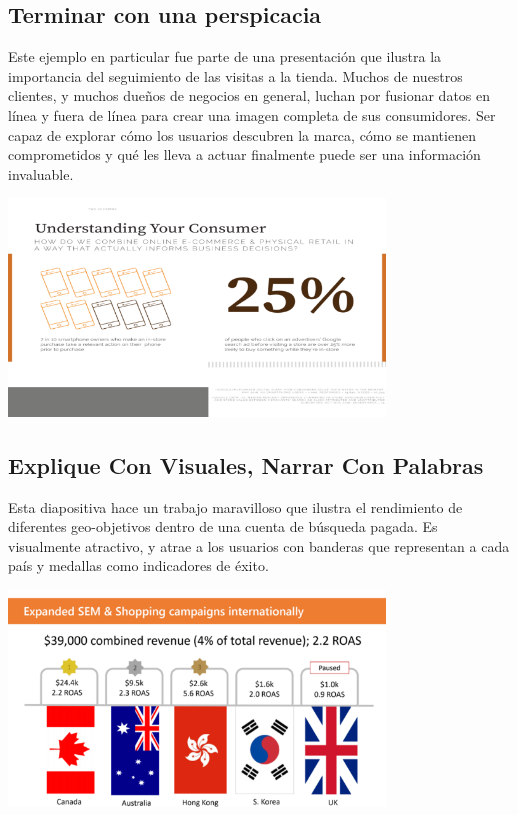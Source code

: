\documentclass[preprint,12pt]{elsarticle}
\begin{document}
\subsection{Terminar con una perspicacia}	
Este ejemplo en particular fue parte de una presentación que ilustra la importancia del seguimiento de las visitas a la tienda. Muchos de nuestros clientes, y muchos dueños de negocios en general, luchan por fusionar datos en línea y fuera de línea para crear una imagen completa de sus consumidores. Ser capaz de explorar cómo los usuarios descubren la marca, cómo se mantienen comprometidos y qué les lleva a actuar finalmente puede ser una información invaluable.
\begin{center}
	\includegraphics[width=10cm]{./Imagenes/ejemplo3} 
\end{center}

\subsection{Explique Con Visuales, Narrar Con Palabras}	
Esta diapositiva hace un trabajo maravilloso que ilustra el rendimiento de diferentes geo-objetivos dentro de una cuenta de búsqueda pagada. Es visualmente atractivo, y atrae a los usuarios con banderas que representan a cada país y medallas como indicadores de éxito. 
\begin{center}
	\includegraphics[width=10cm]{./Imagenes/ejemplo4} 
\end{center}
\end{document}
